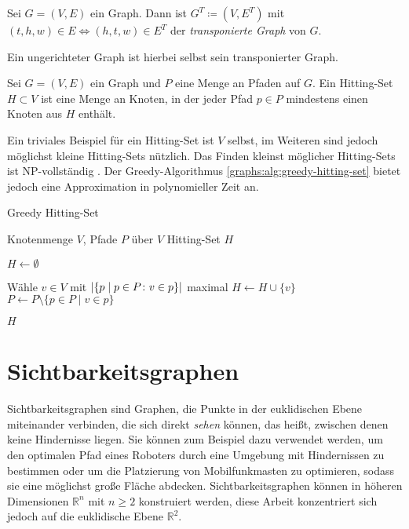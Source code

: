 \begin{definition}
    Sei $G = (V, E)$ ein Graph. Dann ist $G^T \coloneq (V, E^T)$ mit $(t, h, w) \in E \Leftrightarrow (h, t, w) \in E^T$ der \emph{transponierte Graph} von $G$.
\end{definition}

Ein ungerichteter Graph ist hierbei selbst sein transponierter Graph.

\begin{definition}
    Sei $G = (V, E)$ ein Graph und $P$ eine Menge an Pfaden auf $G$.
    Ein Hitting-Set $H \subset V$ ist eine Menge an Knoten, in der jeder Pfad $p \in P$ mindestens einen Knoten aus $H$ enthält.
\end{definition}

Ein triviales Beispiel für ein Hitting-Set ist $V$ selbst, im Weiteren sind jedoch möglichst kleine Hitting-Sets nützlich.
Das Finden kleinst möglicher Hitting-Sets ist NP-vollständig \cite{Kar72}.
Der Greedy-Algorithmus \ref{graphs:alg:greedy-hitting-set} bietet jedoch eine Approximation in polynomieller Zeit an.

\begin{algorithm}
    \caption{Greedy Hitting-Set}
    \begin{algorithmic}[1]
        \Require Knotenmenge $V$, Pfade $P$ über $V$
        \Ensure Hitting-Set $H$

        \State $H \gets \emptyset$

        \State

        \State Wähle $v \in V$ mit $\abs{ \{ p \mid p \in P \colon v \in p \}}$ maximal
        \State $H \gets H \cup \{  v \}$
        \State $P \gets P \setminus \{p \in P \mid v \in p\}$
        \EndWhile

        \State

        \State \Return $H$
    \end{algorithmic}
    \label{graphs:alg:greedy-hitting-set}
\end{algorithm}


\section{Sichtbarkeitsgraphen}

Sichtbarkeitsgraphen sind Graphen, die Punkte in der euklidischen Ebene miteinander verbinden, die sich direkt \emph{sehen} können, das heißt, zwischen denen keine Hindernisse liegen.
Sie können zum Beispiel dazu verwendet werden, um den optimalen Pfad eines Roboters durch eine Umgebung mit Hindernissen zu bestimmen oder um die Platzierung von Mobilfunkmasten zu optimieren, sodass sie eine möglichst große Fläche abdecken.
Sichtbarkeitsgraphen können in höheren Dimensionen $\mathbb{R}^n$ mit $n \geq 2$ konstruiert werden, diese Arbeit konzentriert sich jedoch auf die euklidische Ebene $\mathbb{R}^2$.

